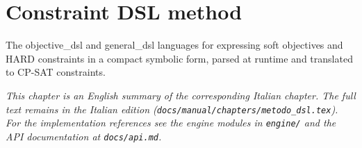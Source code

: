 \chapter{Constraint DSL method}
\label{ch:metodo_dsl_en}

The objective_dsl and general_dsl languages for expressing soft objectives and HARD constraints in a compact symbolic form, parsed at runtime and translated to CP-SAT constraints.

\medskip
\noindent
\textit{This chapter is an English summary of the corresponding Italian chapter. The full text remains in the Italian edition (\texttt{docs/manual/chapters/metodo\_dsl.tex}). For the implementation references see the engine modules in \texttt{engine/} and the API documentation at \texttt{docs/api.md}.}
